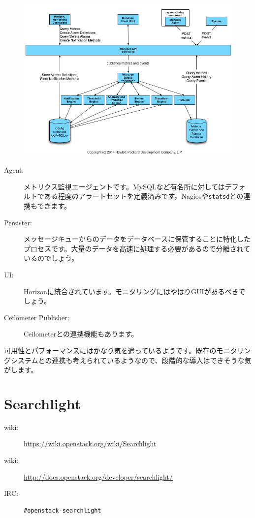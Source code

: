 \begin{figure}[htb]
	\begin{center}
		\includegraphics[width=\textwidth]{img/Monasca-arch-component-diagram.png}
	\end{center}
\end{figure}

\begin{description}
	\item[Agent:] メトリクス監視エージェントです。MySQLなど有名所に対してはデフォルトである程度のアラートセットを定義済みです。Nagiosや\verb|statsd|との連携もできます。
	\item[Persister:] メッセージキューからのデータをデータベースに保管することに特化したプロセスです。大量のデータを高速に処理する必要があるので分離されているのでしょう。
	\item[UI:] Horizonに統合されています。モニタリングにはやはりGUIがあるべきでしょう。
	\item[Ceilometer Publisher:] Ceilometerとの連携機能もあります。
\end{description}

可用性とパフォーマンスにはかなり気を遣っているようです。既存のモニタリングシステムとの連携も考えられているようなので、段階的な導入はできそうな気がします。

\section{Searchlight}

\begin{description}
	\item[wiki:] \url{https://wiki.openstack.org/wiki/Searchlight}
	\item[wiki:] \url{http://docs.openstack.org/developer/searchlight/}
	\item[IRC:] \verb|#openstack-searchlight|
\end{description}

